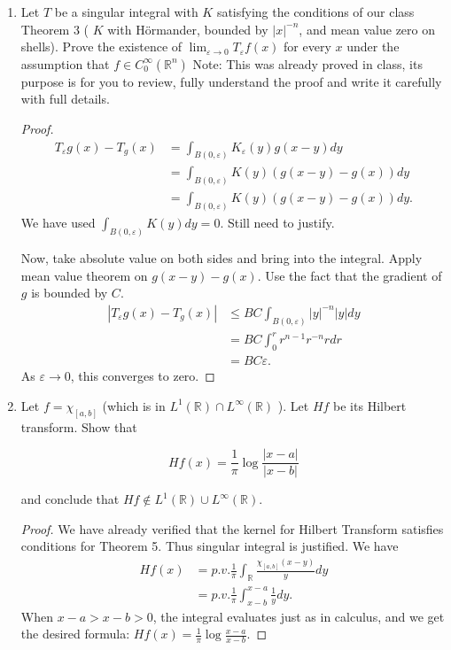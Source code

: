 \begin{enumerate}
\item 
	Let $T$ be a singular integral with $K$ satisfying the conditions of our class Theorem 3 ( $K$ with Hörmander, bounded by $|x|^{-n}$, and mean value zero on shells). Prove the existence of $\lim _{\varepsilon \rightarrow 0} T_{\varepsilon} f(x)$ for every $x$ under the assumption that $f \in C_0^{\infty}\left(\mathbb{R}^n\right)$
Note: This was already proved in class, its purpose is for you to review, fully understand the proof and write it carefully with full details.
\begin{proof}
	\begin{align*}
		T_\varepsilon g(x) - T_g(x)
		&= \int _{B(0,\varepsilon)} K_\varepsilon(y) g(x - y) d y \\
		&= \int _{B(0,\varepsilon)} K(y) (g(x - y) - g(x)) d y \\
		&= \int _{B(0,\varepsilon)} K(y) (g(x - y) - g(x)) d y
	.\end{align*}	
	We have used $\int _{B(0,\varepsilon)} K(y) d y = 0$. Still need to justify. 

	Now, take absolute value on both sides and bring into the integral. Apply mean value theorem on $g(x - y) - g(x)$. Use the fact that the gradient of $g$ is bounded by $C$.
	\begin{align*}
		|
		T_\varepsilon g(x) - T_g(x)|
		&\leq B C \int _{B(0,\varepsilon)} |y|^{- n} |y| d y \\
		&= B C \int_0^r r^{n - 1}r^{- n} r d r \\
		&= B C \varepsilon
	.\end{align*}
	As $\varepsilon \to 0$, this converges to zero.
\end{proof}
\item 
	Let $f=\chi_{[a, b]}$ (which is in $L^1(\mathbb{R}) \cap L^{\infty}(\mathbb{R})$ ). Let $H f$ be its Hilbert transform. Show that

\[
H f(x)=\frac{1}{\pi} \log \frac{|x-a|}{|x-b|}
\]

and conclude that $H f \notin L^1(\mathbb{R}) \cup L^{\infty}(\mathbb{R})$.

\begin{proof}
	We have already verified that the kernel for Hilbert Transform satisfies conditions for Theorem 5. Thus singular integral is justified. We have
	\begin{align*}
		H f(x)
		&= p.v. \frac{1}{\pi} \int _\mathbb{R} \frac{\chi_{[a,b]}(x - y)}{y}dy \\
		&= p.v. \frac{1}{\pi} \int _{x - b}^{x - a} \frac{1}{y} d y
	.\end{align*}
	When $x - a > x - b > 0$, the integral evaluates just as in calculus, and we get the desired formula: $H f(x) = \frac{1}{\pi}\log \frac{x - a}{x - b}$.


\end{proof}
\end{enumerate}
